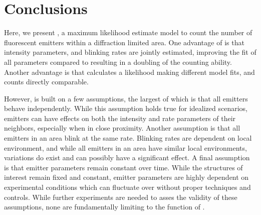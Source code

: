 \section{Conclusions}

Here, we present \ours, a maximum likelihood estimate model to count the number of fluorescent emitters within a diffraction limited area.
%
One advantage of \ours is that intensity parameters, and blinking rates are jointly estimated, improving the fit of all parameters compared to \lbfcs resulting in a doubling of the counting ability. 
%
Another advantage is that \ours calculates a likelihood making different model fits, and counts directly comparable. 
%

However, \ours is built on a few assumptions, the largest of which is that all emitters behave independently. While this assumption holds true for idealized scenarios, emitters can have effects on both the intensity and rate parameters of their neighbors, especially when in close proximity.
%
Another assumption is that all emitters in an area blink at the same rate. Blinking rates are dependent on local environment, and while all emitters in an area have similar local environments, variations do exist and can possibly have a significant effect. 
%
A final assumption is that emitter parameters remain constant over time. While the structures of interest remain fixed and constant, emitter parameters are highly dependent on experimental conditions which can fluctuate over without proper techniques and controls. 
%
While further experiments are needed to asses the validity of these assumptions, none are fundamentally limiting to the function of \ours. 
